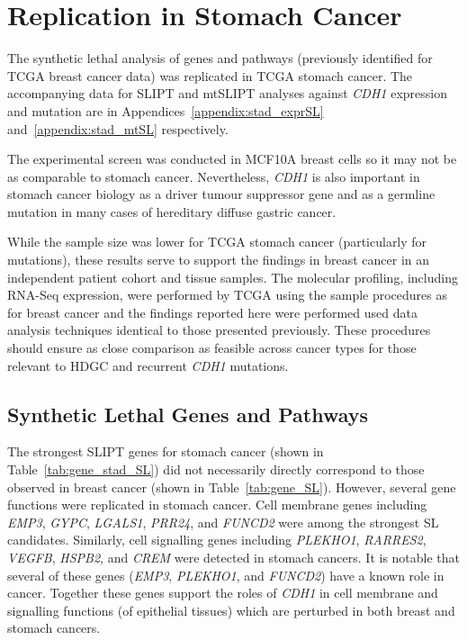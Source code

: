 \FloatBarrier

\section{Replication in Stomach Cancer} \label{chapt3:stad_replication}

The synthetic lethal analysis of genes and pathways (previously identified for TCGA breast cancer data) was replicated in TCGA stomach cancer. The accompanying data for \gls{SLIPT} and mtSLIPT analyses against \textit{CDH1} expression and mutation are in Appendices~\ref{appendix:stad_exprSL} and~\ref{appendix:stad_mtSL} respectively.

The experimental screen \citep{Telford2015} was conducted in MCF10A breast cells so it may not be as comparable to stomach cancer. Nevertheless, \textit{CDH1} is also important in stomach cancer biology as a driver tumour suppressor gene and as a germline mutation in many cases of hereditary diffuse gastric cancer.

While the sample size was lower for TCGA stomach cancer (particularly for mutations), these results serve to support the findings in breast cancer in an independent patient cohort and tissue samples. The molecular profiling, including RNA-Seq expression, were performed by TCGA using the sample procedures as for breast cancer and the findings reported here were performed used data analysis techniques identical to those presented previously. These procedures should ensure as close comparison as feasible across cancer types for those relevant to HDGC and recurrent \textit{CDH1} mutations.

\subsection{Synthetic Lethal Genes and Pathways} \label{chapt3:stad_SL_genes}

The strongest \gls{SLIPT} genes for stomach cancer (shown in Table~\ref{tab:gene_stad_SL}) did not necessarily directly correspond to those observed in breast cancer (shown in Table~\ref{tab:gene_SL}). However, several gene functions were replicated in stomach cancer. Cell membrane genes including \textit{EMP3}, \textit{GYPC},  \textit{LGALS1}, \textit{PRR24},  and \textit{FUNCD2} were among the strongest SL candidates. Similarly, cell signalling genes including \textit{PLEKHO1}, \textit{RARRES2}, \textit{VEGFB}, \textit{HSPB2}, and \textit{CREM} were detected in stomach cancers. It is notable that several of these genes (\textit{EMP3}, \textit{PLEKHO1}, and \textit{FUNCD2}) have a known role in cancer. Together these genes support the roles of \textit{CDH1} in cell membrane and signalling functions (of epithelial tissues) which are perturbed in both breast and stomach cancers.

